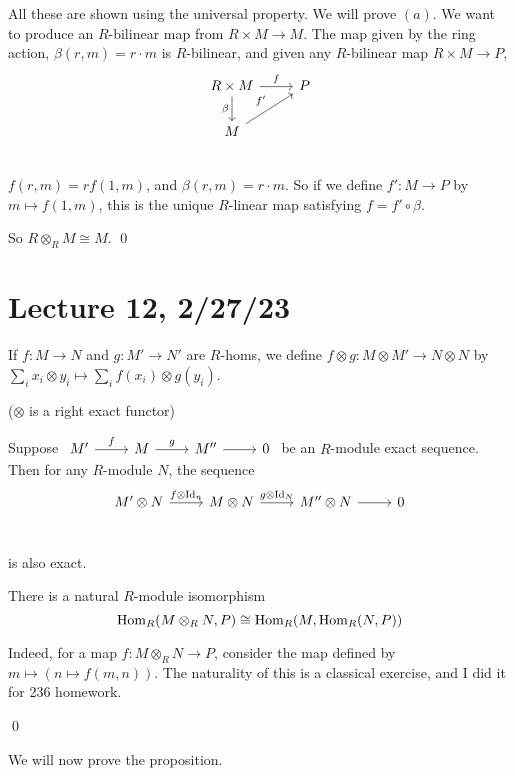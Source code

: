 \documentclass[x11names,reqno,14pt]{extarticle}
\begin{document}
\proof

All these are shown using the universal property. We will prove $(a)$. We want to produce an $R$-bilinear map from $R\times M\to M$. The map given by the ring action, $\beta(r, m) = r\cdot m$ is $R$-bilinear, and given any $R$-bilinear map $R\times M\to P$, 
\[
\begin{tikzcd}
R\times M \ar[r, "f"] \ar[d, "\beta"'] & P \\
M \ar[ur, "f'"]& \\
\end{tikzcd}
\]
$f(r, m) = rf(1, m)$, and $\beta(r, m) = r\cdot m$. So if we define $f':M\to P$ by $m \mapsto f(1, m)$, this is the unique $R$-linear map satisfying $f = f'\circ\beta$. 

So $R\otimes_RM \cong M$.
\qed

\section*{Lecture 12, 2/27/23}

If $f:M\to N$ and $g:M'\to N'$ are $R$-homs, we define $f\otimes g: M\otimes M' \to N\otimes N$ by $\sum_i x_i\otimes y_i \mapsto \sum_i f(x_i)\otimes g(y_i)$. 

\prop ($\otimes$ is a right exact functor)

Suppose $\begin{tikzcd} M'\ar[r, "f"] & M \ar[r, "g"]& M'' \ar[r] & 0 \end{tikzcd}$ be an $R$-module exact sequence. Then for any $R$-module $N$, the sequence 
\[
\begin{tikzcd}
M'\otimes N \ar[r, "f\otimes\Id_n"] & M\otimes N \ar[r, "g\otimes\Id_N"]& M''\otimes N \ar[r] & 0 \\
\end{tikzcd}
\]

is also exact. 

\claim

There is a natural $R$-module isomorphism 
\[
{\mathrm{Hom}}_R(M\otimes_RN, P) \cong {\mathrm{Hom}}_R(M, {\mathrm{Hom}}_R(N, P))
\]

\proof

Indeed, for a map $f:M\otimes_RN\to P$, consider the map defined by $m\mapsto (n\mapsto f(m, n))$. The naturality of this is a classical exercise, and I did it for 236 homework. 

\qed

We will now prove the proposition. 

\proof
\end{document}
